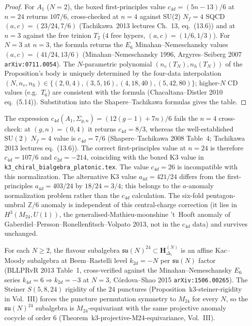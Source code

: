 \begin{proof}
For $A_1$ ($N = 2$), the boxed first-principles value
$c_{4d} = (5n - 13)/6$ at $n = 24$ returns $107/6$, cross-checked at
$n = 4$ against SU(2) $N_f = 4$ SQCD
$(a, c) = (23/24, 7/6)$ (Tachikawa~2013 lectures Ch.\ 13, eq.~(13.6))
and at $n = 3$ against the free trinion $T_2$ ($4$ free hypers,
$(a,c) = (1/6, 1/3)$). For $N = 3$ at $n = 3$, the formula returns
the $E_6$ Minahan--Nemeschansky values $(a, c) = (41/24, 13/6)$
(Minahan--Nemeschansky 1996, Argyres--Seiberg 2007
\texttt{arXiv:0711.0054}). The $N$-parametric polynomial
$(n_v(T_N), n_h(T_N))$ of
the Proposition's body is uniquely determined by the four-data
interpolation $(N, n_v, n_h)\in\{(2,0,4),(3,5,16),(4,18,40),(5,42,80)\}$;
higher-$N$ CD values (e.g.\ $T_6$) are consistent with the formula
(Chacaltana--Distler 2010 eq.\ (5.14)). Substitution into the
Shapere--Tachikawa formulas gives the table.
\end{proof}

\begin{remark}
\label{rem:thqg-occ-A1-central-charge-normalization}
The expression
$c_{4d}(A_1, \Sigma_{g,n}) = (12(g-1) + 7n)/6$
fails the $n = 4$ cross-check: at $(g, n) = (0, 4)$ it returns
$c_{4d} = 8/3$, whereas the well-established
$\mathrm{SU}(2)$ $N_f = 4$ value is $c_{4d} = 7/6$ (Shapere--Tachikawa
2008 Table~4; Tachikawa 2013 lectures eq.~(13.6)). The correct
first-principles value at $n = 24$ is therefore $c_{4d} = 107/6$
and $c_{2d} = -214$, coinciding with the boxed K3 value
in \texttt{k3\_chiral\_bialgebra\_platonic.tex}. The value
$c_{4d} = 26$ is incompatible with this normalization. The
alternative K3 value $a_{4d} = 421/24$ differs from the
first-principles $a_{4d} = 403/24$ by $18/24 = 3/4$; this belongs to
the $a$-anomaly normalization problem rather than the $c_{4d}$
calculation. The six-fold pentagon-umbral
$\mathbb{Z}/6$ anomaly is independent of this
central-charge correction (it lies in $H^3(M_{24}, U(1))$, the
generalised-Mathieu-moonshine 't~Hooft anomaly of
Gaberdiel--Persson--Ronellenfitsch--Volpato 2013, not in the
$c_{4d}$ data) and survives unchanged.
\end{remark}

\begin{remark}
\label{rem:thqg-occ-flavour}
For each $N \ge 2$, the flavour subalgebra $\mathfrak{su}(N)^{24}
\subset \mathbf H^{(N)}_{\Delta_5}$ is an affine Kac--Moody
subalgebra at Beem--Rastelli level $k_{2d} = -N$ per
$\mathfrak{su}(N)$ factor (BLLPRvR 2013 Table~1, cross-verified
against the Minahan--Nemeschansky $E_6$ series
$k_{4d} = 6 \Rightarrow k_{2d} = -3$ at $N = 3$, C\'ordova--Shao
2015 \texttt{arXiv:1506.00265}). The Steiner $S(5,8,24)$ rigidity
of the $24$ punctures (Proposition~k3-steiner-rigidity in
Vol.~III) forces the puncture permutation symmetry to $M_{24}$
for every $N$, so the $\mathfrak{su}(N)^{24}$ subalgebra is
$M_{24}$-equivariant with the same projective anomaly cocycle of
order $6$ (Theorem~k3-projective-M24-equivariance, Vol.~III).
\end{remark}

